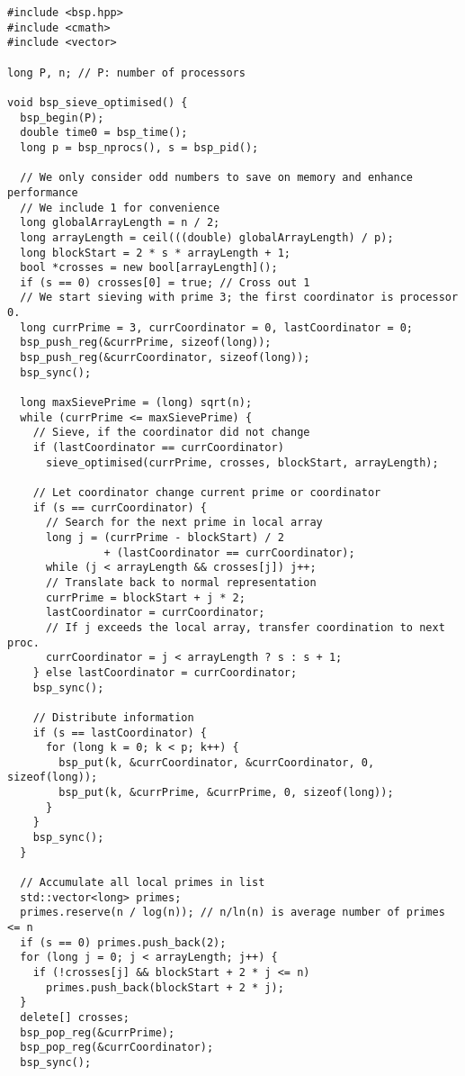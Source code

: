 \documentclass[a4paper,12pt]{article}
\begin{document}
	\begin{lstlisting}[caption={Optimised parallel program for the Sieve of Eratosthenes}, label={prg:par_opt_sieve}, frame={single}]
#include <bsp.hpp>
#include <cmath>
#include <vector>

long P, n; // P: number of processors

void bsp_sieve_optimised() {
  bsp_begin(P);
  double time0 = bsp_time();
  long p = bsp_nprocs(), s = bsp_pid();

  // We only consider odd numbers to save on memory and enhance performance
  // We include 1 for convenience
  long globalArrayLength = n / 2;
  long arrayLength = ceil(((double) globalArrayLength) / p);
  long blockStart = 2 * s * arrayLength + 1;
  bool *crosses = new bool[arrayLength]();
  if (s == 0) crosses[0] = true; // Cross out 1
  // We start sieving with prime 3; the first coordinator is processor 0.
  long currPrime = 3, currCoordinator = 0, lastCoordinator = 0;
  bsp_push_reg(&currPrime, sizeof(long));
  bsp_push_reg(&currCoordinator, sizeof(long));
  bsp_sync();

  long maxSievePrime = (long) sqrt(n);
  while (currPrime <= maxSievePrime) {
    // Sieve, if the coordinator did not change
    if (lastCoordinator == currCoordinator)
      sieve_optimised(currPrime, crosses, blockStart, arrayLength);

    // Let coordinator change current prime or coordinator
    if (s == currCoordinator) {
      // Search for the next prime in local array
      long j = (currPrime - blockStart) / 2
               + (lastCoordinator == currCoordinator);
      while (j < arrayLength && crosses[j]) j++;
      // Translate back to normal representation
      currPrime = blockStart + j * 2;
      lastCoordinator = currCoordinator;
      // If j exceeds the local array, transfer coordination to next proc.
      currCoordinator = j < arrayLength ? s : s + 1;
    } else lastCoordinator = currCoordinator;
    bsp_sync();

    // Distribute information
    if (s == lastCoordinator) {
      for (long k = 0; k < p; k++) {
        bsp_put(k, &currCoordinator, &currCoordinator, 0, sizeof(long));
        bsp_put(k, &currPrime, &currPrime, 0, sizeof(long));
      }
    }
    bsp_sync();
  }

  // Accumulate all local primes in list
  std::vector<long> primes;
  primes.reserve(n / log(n)); // n/ln(n) is average number of primes <= n
  if (s == 0) primes.push_back(2);
  for (long j = 0; j < arrayLength; j++) {
    if (!crosses[j] && blockStart + 2 * j <= n)
      primes.push_back(blockStart + 2 * j);
  }
  delete[] crosses;
  bsp_pop_reg(&currPrime);
  bsp_pop_reg(&currCoordinator);
  bsp_sync();


\end{lstlisting}
\end{document}
